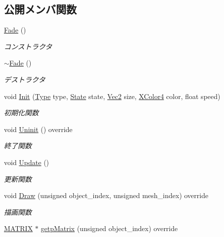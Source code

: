 \subsection*{公開メンバ関数}
\begin{DoxyCompactItemize}
\item 
\mbox{\hyperlink{class_fade_aec1ac5a0a80be8d7a2a43dbde2a741ee}{Fade}} ()
\begin{DoxyCompactList}\small\item\em コンストラクタ \end{DoxyCompactList}\item 
\mbox{\hyperlink{class_fade_a58ddf7585cb85bf84f5e83adbe2734f9}{$\sim$\+Fade}} ()
\begin{DoxyCompactList}\small\item\em デストラクタ \end{DoxyCompactList}\item 
void \mbox{\hyperlink{class_fade_aab12848f7102a219968c86ed699a6e5d}{Init}} (\mbox{\hyperlink{class_fade_ac06f27215b454aa05b93c236476d6e80}{Type}} type, \mbox{\hyperlink{class_fade_ae77826bf3ff2ab95fb7b3b6f95cba80a}{State}} state, \mbox{\hyperlink{_vector3_d_8h_a5ef6e95dfc5f9d3820b71772d99bbc25}{Vec2}} size, \mbox{\hyperlink{_vector3_d_8h_a680c30c4a07d86fe763c7e01169cd6cc}{X\+Color4}} color, float speed)
\begin{DoxyCompactList}\small\item\em 初期化関数 \end{DoxyCompactList}\item 
void \mbox{\hyperlink{class_fade_ae77d06811869d3c8162a42c3e0e14f7f}{Uninit}} () override
\begin{DoxyCompactList}\small\item\em 終了関数 \end{DoxyCompactList}\item 
void \mbox{\hyperlink{class_fade_a1579b5b9020344a1131ea11c15f2c0bd}{Update}} ()
\begin{DoxyCompactList}\small\item\em 更新関数 \end{DoxyCompactList}\item 
void \mbox{\hyperlink{class_fade_a84a9e688650ac500e03cde74ff0210b8}{Draw}} (unsigned object\+\_\+index, unsigned mesh\+\_\+index) override
\begin{DoxyCompactList}\small\item\em 描画関数 \end{DoxyCompactList}\item 
\mbox{\hyperlink{_vector3_d_8h_a032295cd9fb1b711757c90667278e744}{M\+A\+T\+R\+IX}} $\ast$ \mbox{\hyperlink{class_fade_a2e41a31f9801476e63d2082804375e96}{getp\+Matrix}} (unsigned object\+\_\+index) override

\end{DoxyCompactItemize}
